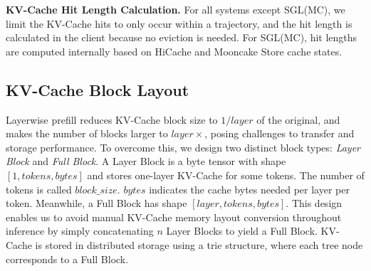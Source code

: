 \textbf{KV-Cache Hit Length Calculation.}
For all systems except SGL(MC), we limit the KV-Cache hits to only occur within a trajectory, and the hit length is calculated in the client because no eviction is needed.
For SGL(MC), hit lengths are computed internally based on HiCache and Mooncake Store cache states.

\subsection{KV-Cache Block Layout}
\label{subsec:block-layout}
Layerwise prefill reduces KV-Cache block size to $1/layer$ of the original, and makes the number of blocks larger to $layer\times$, posing challenges to transfer and storage performance.
To overcome this, we design two distinct block types: \emph{Layer Block} and \emph{Full Block}.
A Layer Block is a byte tensor with shape $[1, tokens, bytes]$ and stores one-layer KV-Cache for some tokens.
The number of tokens is called $block\_size$.
$bytes$ indicates the cache bytes needed per layer per token.
Meanwhile, a Full Block has shape $[layer, tokens, bytes]$.
This design enables us to avoid manual KV-Cache memory layout conversion throughout inference by simply concatenating $n$ Layer Blocks to yield a Full Block.
KV-Cache is stored in distributed storage using a trie structure, where each tree node corresponds to a Full Block.